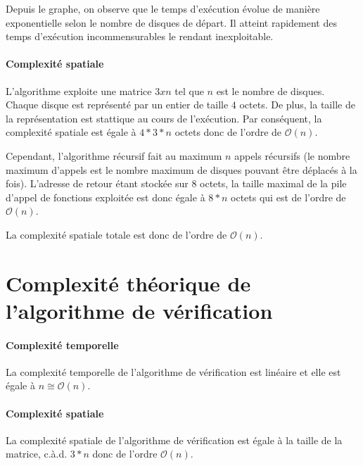 Depuis le graphe, on observe que le temps d'exécution évolue de manière exponentielle selon le nombre de disques de départ. Il atteint rapidement des temps d'exécution incommensurables le rendant inexploitable.

\paragraph{Complexité spatiale}
L'algorithme exploite une matrice $3 x n$ tel que $n$ est le nombre de disques. Chaque disque est représenté par un entier de taille $4$ octets. De plus, la taille de la représentation est stattique au cours de l'exécution. Par conséquent, la complexité spatiale est égale à $4 * 3 * n$ octets donc de l'ordre de $\mathcal{O}(n)$.
\par
Cependant, l'algorithme récursif fait au maximum $n$ appels récursifs (le nombre maximum d'appels est le nombre maximum de disques pouvant être déplacés à la fois). L'adresse de retour étant stockée sur $8$ octets, la taille maximal de la pile d'appel de fonctions exploitée est donc égale à $8 * n$ octets qui est de l'ordre de $\mathcal{O}(n)$.
\par
La complexité spatiale totale est donc de l'ordre de $\mathcal{O}(n)$.

\section{Complexité théorique de l'algorithme de vérification}
\paragraph{Complexité temporelle}
La complexité temporelle de l'algorithme de vérification est linéaire et elle est égale à $n \cong \mathcal{O}(n)$.
\paragraph{Complexité spatiale}
La complexité spatiale de l'algorithme de vérification est égale à la taille de la matrice, c.à.d. $3 * n$ donc de l'ordre $\mathcal{O}(n)$.
